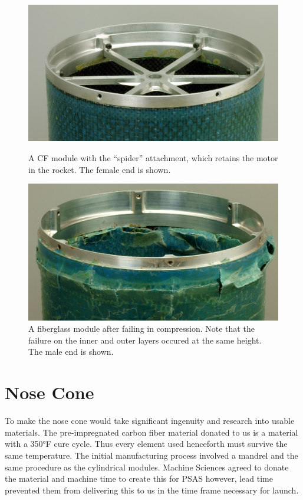 \documentclass{aiaa-tc}%
\begin{document}
\begin{figure}[t]
	\centering
	\parbox{0.45\linewidth}
	{
		\centering
		\includegraphics[width=\linewidth]{../img/moduleWithSpider.png}
		\caption{A CF module with the ``spider'' attachment, which retains the motor in the rocket. The female end is shown.}
		\label{fig:module}
	}
	\hfill
	\parbox{0.45\linewidth}
	{
		\centering
		\includegraphics[width=\linewidth]{../img/FG_fracture.jpg}
		\caption{A fiberglass module after failing in compression. Note that the failure on the inner and outer layers occured at the same height. The male end is shown.}
		\label{fig:crush}
	}
\end{figure}

\section{Nose Cone}\label{sec:noseCone}

%
To make the nose cone would take significant ingenuity and research into usable materials. The pre-impregnated carbon fiber material donated to us is a material with a 350°F cure cycle. Thus every element used henceforth must survive the same temperature. The initial manufacturing process involved a mandrel and the same procedure as the cylindrical modules. Machine Sciences agreed to donate the material and machine time to create this for PSAS however, lead time prevented them from delivering this to us in the time frame necessary for launch. 
\end{document}
